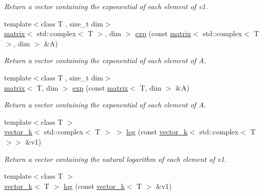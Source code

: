 \begin{DoxyCompactItemize}
\begin{DoxyCompactList}\small\item\em Return a vector containing the exponential of each element of v1. \end{DoxyCompactList}\item 
\hypertarget{namespacekeycpp_a0302faeef7172f537f3473216c0cf33b}{{\footnotesize template$<$class T , size\-\_\-t dim$>$ }\\\hyperlink{classkeycpp_1_1matrix}{matrix}$<$ std\-::complex$<$ T $>$, dim $>$ \hyperlink{namespacekeycpp_a0302faeef7172f537f3473216c0cf33b}{exp} (const \hyperlink{classkeycpp_1_1matrix}{matrix}$<$ std\-::complex$<$ T $>$, dim $>$ \&A)}\label{namespacekeycpp_a0302faeef7172f537f3473216c0cf33b}

\begin{DoxyCompactList}\small\item\em Return a vector containing the exponential of each element of A. \end{DoxyCompactList}\item 
\hypertarget{namespacekeycpp_a89087f62a5d5d136ad88493b920953ac}{{\footnotesize template$<$class T , size\-\_\-t dim$>$ }\\\hyperlink{classkeycpp_1_1matrix}{matrix}$<$ T, dim $>$ \hyperlink{namespacekeycpp_a89087f62a5d5d136ad88493b920953ac}{exp} (const \hyperlink{classkeycpp_1_1matrix}{matrix}$<$ T, dim $>$ \&A)}\label{namespacekeycpp_a89087f62a5d5d136ad88493b920953ac}

\begin{DoxyCompactList}\small\item\em Return a vector containing the exponential of each element of A. \end{DoxyCompactList}\item 
\hypertarget{namespacekeycpp_a3f3de1f36299e80f237c0e9669b9ee1d}{{\footnotesize template$<$class T $>$ }\\\hyperlink{classkeycpp_1_1vector__k}{vector\-\_\-k}$<$ std\-::complex$<$ T $>$ $>$ \hyperlink{namespacekeycpp_a3f3de1f36299e80f237c0e9669b9ee1d}{log} (const \hyperlink{classkeycpp_1_1vector__k}{vector\-\_\-k}$<$ std\-::complex$<$ T $>$$>$ \&v1)}\label{namespacekeycpp_a3f3de1f36299e80f237c0e9669b9ee1d}

\begin{DoxyCompactList}\small\item\em Return a vector containing the natural logarithm of each element of v1. \end{DoxyCompactList}\item 
\hypertarget{namespacekeycpp_a1b4681da0aec9ca45280970b47fd55d6}{{\footnotesize template$<$class T $>$ }\\\hyperlink{classkeycpp_1_1vector__k}{vector\-\_\-k}$<$ T $>$ \hyperlink{namespacekeycpp_a1b4681da0aec9ca45280970b47fd55d6}{log} (const \hyperlink{classkeycpp_1_1vector__k}{vector\-\_\-k}$<$ T $>$ \&v1)}\label{namespacekeycpp_a1b4681da0aec9ca45280970b47fd55d6}


\end{DoxyCompactItemize}
